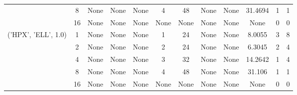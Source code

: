 \begin{tabular}{cccccccccccc}
& 8& None& None& None& 4& 48& None& None& 31.4694& 1& 1\\
& 16& None& None& None& None& None& None& None& None& 0& 0\\
\hline
\multirow{5}{*}{('HPX', 'ELL', 1.0)}& 1& None& None& None& 1& 24& None& None& 8.0055& 3& 8\\
& 2& None& None& None& 2& 24& None& None& 6.3045& 2& 4\\
& 4& None& None& None& 3& 32& None& None& 14.2642& 1& 4\\
& 8& None& None& None& 4& 48& None& None& 31.106& 1& 1\\
& 16& None& None& None& None& None& None& None& None& 0& 0\\
\hline
\end{tabular}




